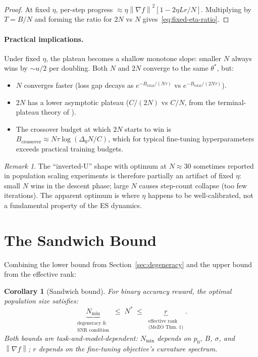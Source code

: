 \documentclass[11pt]{article}
\newtheorem{corollary}[theorem]{Corollary}
\theoremstyle{definition}
\theoremstyle{remark}
\newtheorem{remark}[theorem]{Remark}
\newcommand{\norm}[1]{\left\|#1\right\|}
\newcommand{\Nmin}{N_{\mathrm{min}}}
\begin{document}
\begin{proof}
At fixed $\eta$, per-step progress $\approx \eta\norm{\nabla f}^2[1 - 2\eta Lr/N]$. Multiplying by $T = B/N$ and forming the ratio for $2N$ vs $N$ gives~\eqref{eq:fixed-eta-ratio}.
\end{proof}

\paragraph{Practical implications.}
Under fixed $\eta$, the plateau becomes a shallow monotone slope: smaller $N$ always wins by $\sim u/2$ per doubling. Both $N$ and $2N$ converge to the same $\theta^*$, but:
\begin{itemize}[leftmargin=*]
  \item $N$ converges faster (loss gap decays as $e^{-B_{\mathrm{total}}/(N\tau)}$ vs $e^{-B_{\mathrm{total}}/(2N\tau)}$).
  \item $2N$ has a lower asymptotic plateau ($C/(2N)$ vs $C/N$, from the terminal-plateau theory of \citet{liang2026blessing}).
  \item The crossover budget at which $2N$ starts to win is $B_{\mathrm{crossover}} \approx N\tau\log(\Delta_0 N/C)$, which for typical fine-tuning hyperparameters exceeds practical training budgets.
\end{itemize}

\begin{remark}
The ``inverted-U'' shape with optimum at $N \approx 30$ sometimes reported in population scaling experiments is therefore partially an artifact of fixed $\eta$: small $N$ wins in the descent phase; large $N$ causes step-count collapse (too few iterations). The apparent optimum is where $\eta$ happens to be well-calibrated, not a fundamental property of the ES dynamics.
\end{remark}

\section{The Sandwich Bound}
\label{sec:sandwich}

Combining the lower bound from Section~\ref{sec:degeneracy} and the upper bound from the effective rank:

\begin{corollary}[Sandwich bound]
\label{cor:sandwich}
For binary accuracy reward, the optimal population size satisfies:
\begin{equation}
  \underbrace{\Nmin}_{\substack{\text{degeneracy \&} \\ \text{SNR condition}}} \;\leq\; N^* \;\leq\; \underbrace{r}_{\substack{\text{effective rank} \\ \text{(MeZO Thm.~1)}}}.
  \label{eq:sandwich}
\end{equation}
Both bounds are task-and-model-dependent: $\Nmin$ depends on $p_0$, $B$, $\sigma$, and $\norm{\nabla f}$; $r$ depends on the fine-tuning objective's curvature spectrum.
\end{corollary}
\end{document}
